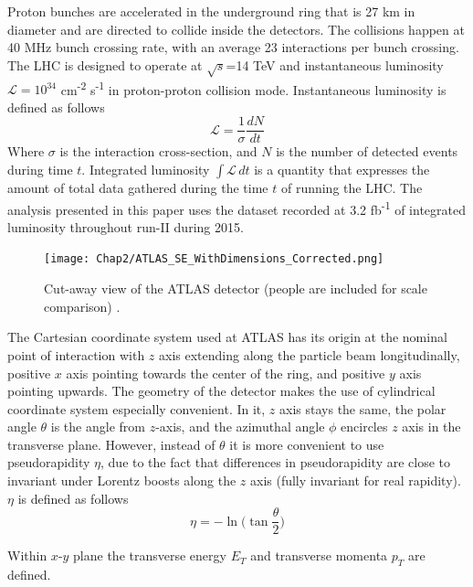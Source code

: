 Proton bunches are accelerated in the underground ring that is 27 km in diameter and are directed to collide inside the detectors. The collisions happen at 40 MHz bunch crossing rate, with an average 23 interactions per bunch crossing. The LHC is designed to operate at $\sqrt{s}$=14 TeV and instantaneous luminosity $\mathcal{L} = 10^{34}$ cm\textsuperscript{-2} s\textsuperscript{-1} in proton-proton collision mode. Instantaneous luminosity is defined as follows
\begin{equation}
\mathcal{L} = \frac{1}{\sigma}\frac{dN}{dt}
\end{equation}  
Where $\sigma$ is the interaction cross-section, and $N$ is the number of detected events during time $t$. Integrated luminosity $\int \mathcal{L}\, dt$ is a quantity that expresses the amount of total data gathered during the time $t$ of running the LHC. The analysis presented in this paper uses the dataset recorded at 3.2 fb\textsuperscript{-1} of integrated luminosity throughout run-II during 2015.  


\begin{figure}[!t]
	\centering
    \captionsetup{width=\textwidth}
	\texttt{[image: Chap2/ATLAS\_SE\_WithDimensions\_Corrected.png]}
\caption{\label{fig:detector}  Cut-away view of the ATLAS detector (people are included for scale comparison) \citep{aad2008atlas}. }
\end{figure}

The Cartesian coordinate system used at ATLAS has its origin at the nominal point of interaction with $z$ axis extending along the particle beam longitudinally, positive $x$ axis pointing towards the center of the ring, and positive $y$ axis pointing upwards. 
The geometry of the detector makes the use of cylindrical coordinate system especially convenient. In it, $z$ axis stays the same, the polar angle $\theta$ is the angle from $z$-axis, and the azimuthal angle $\phi$ encircles $z$ axis in the transverse plane. However, instead of $\theta$ it is more convenient to use pseudorapidity $\eta$, due to the fact that differences in pseudorapidity are close to invariant under Lorentz boosts along the $z$ axis (fully invariant for real rapidity). $\eta$ is defined as follows
\begin{equation}
\eta = -\ln\biggl(\tan\frac{\theta}{2}\biggr)
\end{equation}

Within $x$-$y$ plane the transverse energy $E_{T}$ and transverse momenta $p_{T}$ are defined.

